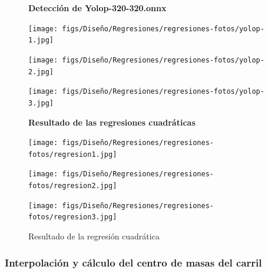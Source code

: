 \begin{figure}[H]
  \centering
  \textbf{Detección de Yolop-320-320.onnx}
  \vspace{0.5cm}

  \begin{minipage}[t]{0.3\textwidth}
      \centering
      \texttt{[image: figs/Diseño/Regresiones/regresiones-fotos/yolop-1.jpg]}
      \caption*{}
  \end{minipage}
  \hfill
  \begin{minipage}[t]{0.3\textwidth}
      \centering
      \texttt{[image: figs/Diseño/Regresiones/regresiones-fotos/yolop-2.jpg]}
      \caption*{}
  \end{minipage}
  \hfill
  \begin{minipage}[t]{0.3\textwidth}
      \centering
      \texttt{[image: figs/Diseño/Regresiones/regresiones-fotos/yolop-3.jpg]}
      \caption*{}
  \end{minipage}

  \vspace{0.5cm}

  \textbf{Resultado de las regresiones cuadráticas}
  \vspace{0.5cm}

  \begin{minipage}[t]{0.3\textwidth}
      \centering
      \texttt{[image: figs/Diseño/Regresiones/regresiones-fotos/regresion1.jpg]}
      \caption*{}
  \end{minipage}
  \hfill
  \begin{minipage}[t]{0.3\textwidth}
      \centering
      \texttt{[image: figs/Diseño/Regresiones/regresiones-fotos/regresion2.jpg]}
      \caption*{}
  \end{minipage}
  \hfill
  \begin{minipage}[t]{0.3\textwidth}
      \centering
      \texttt{[image: figs/Diseño/Regresiones/regresiones-fotos/regresion3.jpg]}
      \caption*{}
  \end{minipage}

  \caption{Resultado de la regresión cuadrática}
  \label{fig:regresión cuadrática}
\end{figure}


\subsubsection{Interpolación y cálculo del centro de masas del carril}
\label{sec:Interpolación y cálculo del centro de masas del carril}


